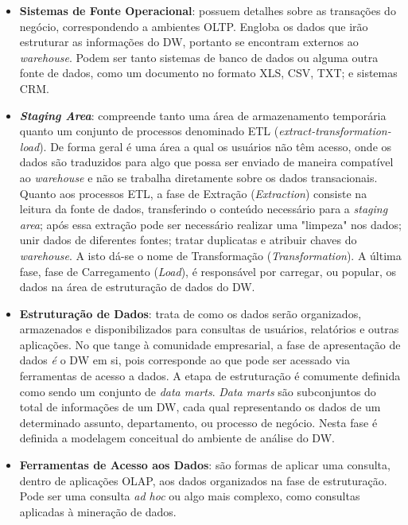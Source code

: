 \begin{itemize}
    \item \textbf{Sistemas de Fonte Operacional}: possuem detalhes sobre as transações do negócio, correspondendo a ambientes OLTP. Engloba os dados que irão estruturar as informações do DW, portanto se encontram externos ao \textit{warehouse}. Podem ser tanto sistemas de banco de dados ou alguma outra fonte de dados, como um documento no formato XLS, CSV, TXT; e sistemas CRM.
    \item \textbf{\textit{Staging Area}}: compreende tanto uma área de armazenamento temporária quanto um conjunto de processos denominado ETL (\textit{extract-transformation-load}). De forma geral é uma área a qual os usuários não têm acesso, onde os dados são traduzidos para algo que possa ser enviado de maneira compatível ao \textit{warehouse} e não se trabalha diretamente sobre os dados transacionais. Quanto aos processos ETL, a fase de Extração (\textit{Extraction}) consiste na leitura da fonte de dados, transferindo o conteúdo necessário para a \textit{staging area}; após essa extração pode ser necessário realizar uma "limpeza" nos dados; unir dados de diferentes fontes; tratar duplicatas e atribuir chaves do \textit{warehouse}. A isto dá-se o nome de Transformação (\textit{Transformation}). A última fase, fase de Carregamento (\textit{Load}), é responsável por carregar, ou popular, os dados na área de estruturação de dados do DW.
    \item \textbf{Estruturação de Dados}: trata de como os dados serão organizados, armazenados e disponibilizados para consultas de usuários, relatórios e outras aplicações. No que tange à comunidade empresarial, a fase de apresentação de dados \textit{é} o DW em si, pois corresponde ao que pode ser acessado via ferramentas de acesso a dados. A etapa de estruturação é comumente definida como sendo um conjunto de \textit{data marts}. \textit{Data marts} são subconjuntos do total de informações de um DW, cada qual representando os dados de um determinado assunto, departamento, ou processo de negócio. Nesta fase é definida a modelagem conceitual do ambiente de análise do DW.
    \item \textbf{Ferramentas de Acesso aos Dados}: são formas de aplicar uma consulta, dentro de aplicações OLAP, aos dados organizados na fase de estruturação. Pode ser uma consulta \textit{ad hoc} ou algo mais complexo, como consultas aplicadas à mineração de dados.
    
\end{itemize}

